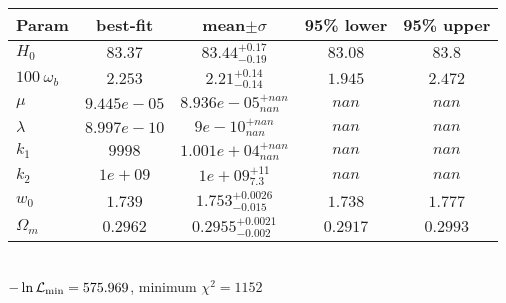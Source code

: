 \begin{tabular}{|l|c|c|c|c|} 
 \hline 
Param & best-fit & mean$\pm\sigma$ & 95\% lower & 95\% upper \\ \hline 
$H_{0 }$ &$83.37$ & $83.44_{-0.19}^{+0.17}$ & $83.08$ & $83.8$ \\ 
$100~\omega_{b }$ &$2.253$ & $2.21_{-0.14}^{+0.14}$ & $1.945$ & $2.472$ \\ 
$\mu$ &$9.445e-05$ & $8.936e-05_{nan}^{+nan}$ & $nan$ & $nan$ \\ 
$\lambda$ &$8.997e-10$ & $9e-10_{nan}^{+nan}$ & $nan$ & $nan$ \\ 
$k_{1 }$ &$9998$ & $1.001e+04_{nan}^{+nan}$ & $nan$ & $nan$ \\ 
$k_{2 }$ &$1e+09$ & $1e+09_{7.3}^{+11}$ & $nan$ & $nan$ \\ 
$w_{0 }$ &$1.739$ & $1.753_{-0.015}^{+0.0026}$ & $1.738$ & $1.777$ \\ 
$\Omega_{m }$ &$0.2962$ & $0.2955_{-0.002}^{+0.0021}$ & $0.2917$ & $0.2993$ \\ 
\hline 
 \end{tabular} \\ 
$-\ln{\cal L}_\mathrm{min} =575.969$, minimum $\chi^2=1152$ \\ 
